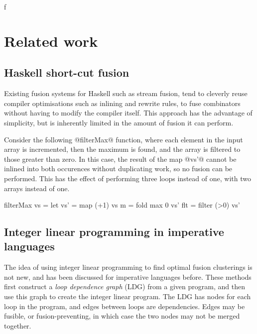f\section{Related work}

\subsection{Haskell short-cut fusion}
Existing fusion systems for Haskell such as stream fusion\cite{coutts2007streamfusion, mainland2013exploiting}, tend to cleverly reuse compiler optimisations such as inlining and rewrite rules\cite{peytonjones2001rules}, to fuse combinators without having to modify the compiler itself.
This approach has the advantage of simplicity, but is inherently limited in the amount of fusion it can perform.

Consider the following @filterMax@ function, where each element in the input array is incremented, then the maximum is found, and the array is filtered to those greater than zero.
In this case, the result of the map @vs'@ cannot be inlined into both occurences without duplicating work, so no fusion can be performed.
This has the effect of performing three loops instead of one, with two arrays instead of one.

\begin{code}
filterMax vs =
 let vs' = map    (+1)  vs
     m   = fold   max 0 vs'
     flt = filter (>0)  vs'
\end{code}

\subsection{Integer linear programming in imperative languages}
The idea of using integer linear programming to find optimal fusion clusterings is not new, and has been discussed for imperative languages before.
These methods first construct a \emph{loop dependence graph} (LDG) from a given program, and then use this graph to create the integer linear program.
The LDG has nodes for each loop in the program, and edges between loops are dependencies.
Edges may be fusible, or fusion-preventing, in which case the two nodes may not be merged together.

